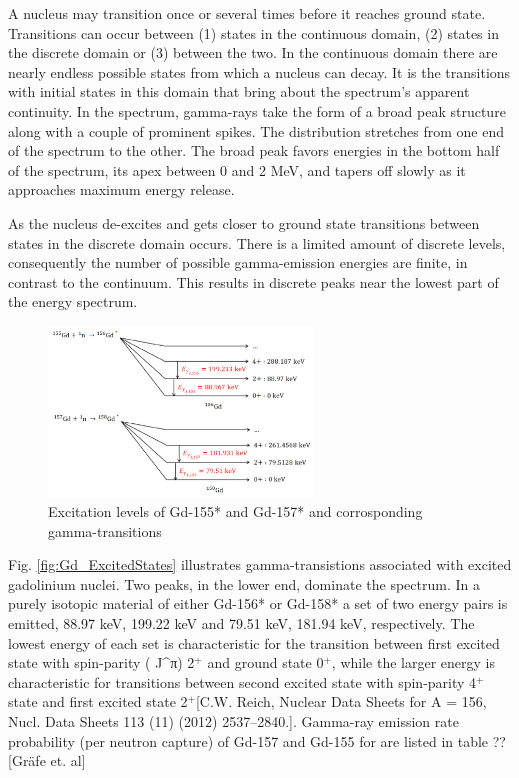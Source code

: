 A nucleus may transition once or several times before it reaches ground state.
Transitions can occur between (1) states in the continuous domain, (2) states in the discrete domain or (3) between the two. In the continuous domain there are nearly endless possible states from which a nucleus can decay.  It is the transitions with initial states in this domain that bring about the spectrum’s apparent continuity.
In the spectrum, gamma-rays take the form of a broad peak structure along with a couple of prominent spikes. The distribution stretches from one end of the spectrum to the other. The broad peak favors energies in the bottom half of the spectrum, its apex between 0 and 2 MeV, and tapers off slowly as it approaches maximum energy release.

As the nucleus de-excites and gets closer to ground state transitions between states in the discrete domain occurs. There is a limited amount of discrete levels, consequently the number of possible gamma-emission energies are finite, in contrast to the continuum. This results in discrete peaks near the lowest part of the energy spectrum.

\begin{figure}
  \centering
  \includegraphics[width=7cm]{fig/Gd_ExcitedStates.png}
  \caption{Excitation levels of Gd-155* and Gd-157* and corrosponding gamma-transitions}
  \label{fig:1}
\end{figure}

Fig. \ref{fig:Gd_ExcitedStates} illustrates gamma-transistions associated with excited gadolinium nuclei. Two peaks, in the lower end, dominate the spectrum. In a purely isotopic material of either Gd-156* or Gd-158* a set of two energy pairs is emitted, {88.97 keV, 199.22 keV} and {79.51 keV, 181.94 keV}, respectively. The lowest energy of each set is characteristic for the transition between first excited state with spin-parity ( J^π)  2$^+$  and ground state 0$^+$, while the larger energy is characteristic for transitions between second excited state with spin-parity 4$^+$ state and first excited state 2$^+$[C.W. Reich, Nuclear Data Sheets for A = 156, Nucl. Data Sheets 113 (11) (2012) 2537–2840.]. Gamma-ray emission rate probability (per neutron capture) of Gd-157 and Gd-155 for are listed in table ?? [Gräfe et. al]

